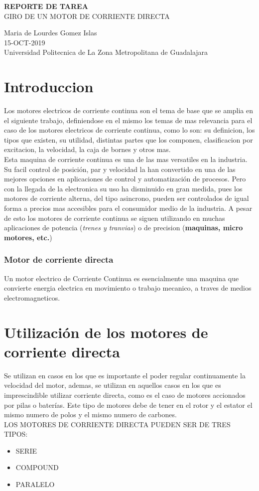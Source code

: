 \documentclass[11pt,a4paper]{article}
\begin{document}
\begin{center}
\textbf{REPORTE DE TAREA}\\
GIRO DE UN MOTOR DE CORRIENTE DIRECTA
\end{center}

\begin{center}
Maria de Lourdes Gomez Islas\\
15-OCT-2019\\
Universidad Politecnica de La Zona Metropolitana de Guadalajara
\end{center}

\part{Introduccion}
Los motores electricos de corriente continua son el tema de base que se amplia en el siguiente trabajo, definiendose en el mismo los temas de mas relevancia para el caso de los motores electricos de corriente continua, como lo son: su definicion, los tipos que existen, su utilidad, distintas partes que los componen, clasificacion por excitacion, la velocidad, la caja de bornes y otros mas.\\
Esta maquina de corriente continua es una de las mas versatiles en la industria. Su facil control de posición, par y velocidad la han convertido en una de las mejores opciones en aplicaciones de control y automatización de procesos. Pero con la llegada de la electronica su uso ha disminuido en gran medida, pues los motores de corriente alterna, del tipo asincrono, pueden ser controlados de igual forma a precios mas accesibles para el consumidor medio de la industria. A pesar de esto los motores de corriente continua se siguen utilizando en muchas aplicaciones de potencia (\emph{trenes y tranvias}) o de precision (\textbf{maquinas, micro motores, etc.})

\section{Motor de corriente directa}
Un motor electrico de Corriente Continua es esencialmente una maquina que convierte energia electrica en movimiento o trabajo mecanico, a traves de medios electromagneticos.

\part{Utilización de los motores de corriente directa}
Se utilizan en casos en los que es importante el poder regular continuamente la velocidad del motor, ademas, se utilizan en aquellos casos en los que es imprescindible utilizar corriente directa, como es el caso de motores accionados por pilas o baterías. Este tipo de motores debe de tener en el rotor y el estator el mismo numero de polos y el mismo numero de carbones.\\
LOS MOTORES DE CORRIENTE DIRECTA PUEDEN SER DE TRES TIPOS:\begin{itemize}
\item SERIE
\item COMPOUND
\item PARALELO
\end{itemize}
\end{document}
